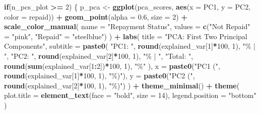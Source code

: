 \documentclass[
]{article}
\newenvironment{Shaded}{\begin{snugshade}}{\end{snugshade}}
\newcommand{\AttributeTok}[1]{\textcolor[rgb]{0.13,0.29,0.53}{#1}}
\newcommand{\ControlFlowTok}[1]{\textcolor[rgb]{0.13,0.29,0.53}{\textbf{#1}}}
\newcommand{\DecValTok}[1]{\textcolor[rgb]{0.00,0.00,0.81}{#1}}
\newcommand{\FloatTok}[1]{\textcolor[rgb]{0.00,0.00,0.81}{#1}}
\newcommand{\FunctionTok}[1]{\textcolor[rgb]{0.13,0.29,0.53}{\textbf{#1}}}
\newcommand{\NormalTok}[1]{#1}
\newcommand{\OtherTok}[1]{\textcolor[rgb]{0.56,0.35,0.01}{#1}}
\newcommand{\SpecialCharTok}[1]{\textcolor[rgb]{0.81,0.36,0.00}{\textbf{#1}}}
\newcommand{\StringTok}[1]{\textcolor[rgb]{0.31,0.60,0.02}{#1}}
\begin{document}
\begin{Shaded}
\begin{Highlighting}[]
  \ControlFlowTok{if}\NormalTok{(n\_pcs\_plot }\SpecialCharTok{\textgreater{}=} \DecValTok{2}\NormalTok{) \{}
\NormalTok{    p\_pca }\OtherTok{\textless{}{-}} \FunctionTok{ggplot}\NormalTok{(pca\_scores, }\FunctionTok{aes}\NormalTok{(}\AttributeTok{x =}\NormalTok{ PC1, }\AttributeTok{y =}\NormalTok{ PC2, }\AttributeTok{color =}\NormalTok{ repaid)) }\SpecialCharTok{+}
      \FunctionTok{geom\_point}\NormalTok{(}\AttributeTok{alpha =} \FloatTok{0.6}\NormalTok{, }\AttributeTok{size =} \DecValTok{2}\NormalTok{) }\SpecialCharTok{+}
      \FunctionTok{scale\_color\_manual}\NormalTok{(}
        \AttributeTok{name =} \StringTok{"Repayment Status"}\NormalTok{,}
        \AttributeTok{values =} \FunctionTok{c}\NormalTok{(}\StringTok{"Not Repaid"} \OtherTok{=} \StringTok{"pink"}\NormalTok{, }\StringTok{"Repaid"} \OtherTok{=} \StringTok{"steelblue"}\NormalTok{)}
\NormalTok{      ) }\SpecialCharTok{+}
      \FunctionTok{labs}\NormalTok{(}
        \AttributeTok{title =} \StringTok{"PCA: First Two Principal Components"}\NormalTok{,}
        \AttributeTok{subtitle =} \FunctionTok{paste0}\NormalTok{(}
          \StringTok{"PC1: "}\NormalTok{, }\FunctionTok{round}\NormalTok{(explained\_var[}\DecValTok{1}\NormalTok{]}\SpecialCharTok{*}\DecValTok{100}\NormalTok{, }\DecValTok{1}\NormalTok{), }\StringTok{"\% | "}\NormalTok{,}
          \StringTok{"PC2: "}\NormalTok{, }\FunctionTok{round}\NormalTok{(explained\_var[}\DecValTok{2}\NormalTok{]}\SpecialCharTok{*}\DecValTok{100}\NormalTok{, }\DecValTok{1}\NormalTok{), }\StringTok{"\% | "}\NormalTok{,}
          \StringTok{"Total: "}\NormalTok{, }\FunctionTok{round}\NormalTok{(}\FunctionTok{sum}\NormalTok{(explained\_var[}\DecValTok{1}\SpecialCharTok{:}\DecValTok{2}\NormalTok{])}\SpecialCharTok{*}\DecValTok{100}\NormalTok{, }\DecValTok{1}\NormalTok{), }\StringTok{"\%"}
\NormalTok{        ),}
        \AttributeTok{x =} \FunctionTok{paste0}\NormalTok{(}\StringTok{"PC1 ("}\NormalTok{, }\FunctionTok{round}\NormalTok{(explained\_var[}\DecValTok{1}\NormalTok{]}\SpecialCharTok{*}\DecValTok{100}\NormalTok{, }\DecValTok{1}\NormalTok{), }\StringTok{"\%)"}\NormalTok{),}
        \AttributeTok{y =} \FunctionTok{paste0}\NormalTok{(}\StringTok{"PC2 ("}\NormalTok{, }\FunctionTok{round}\NormalTok{(explained\_var[}\DecValTok{2}\NormalTok{]}\SpecialCharTok{*}\DecValTok{100}\NormalTok{, }\DecValTok{1}\NormalTok{), }\StringTok{"\%)"}\NormalTok{)}
\NormalTok{      ) }\SpecialCharTok{+}
      \FunctionTok{theme\_minimal}\NormalTok{() }\SpecialCharTok{+}
      \FunctionTok{theme}\NormalTok{(}
        \AttributeTok{plot.title =} \FunctionTok{element\_text}\NormalTok{(}\AttributeTok{face =} \StringTok{"bold"}\NormalTok{, }\AttributeTok{size =} \DecValTok{14}\NormalTok{),}
        \AttributeTok{legend.position =} \StringTok{"bottom"}
\NormalTok{      )}
    

\end{Highlighting}
\end{Shaded}
\end{document}
